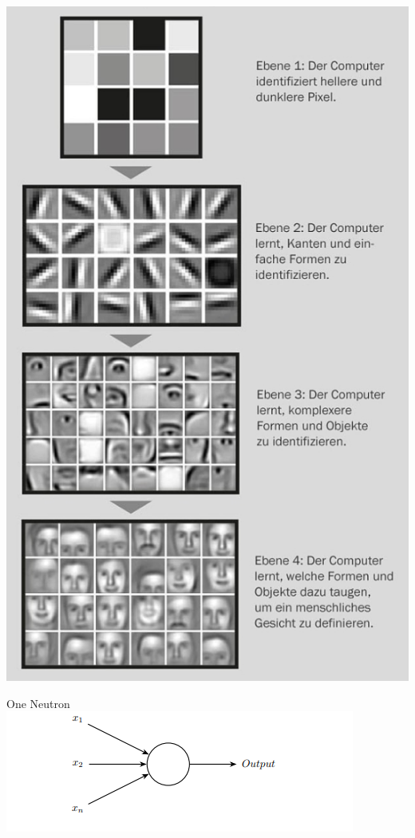 \documentclass{beamer}{}
\begin{document}
    \begin{frame}[plain]
        \center\includegraphics[height=\textheight]{img/4.png}
    \end{frame}
    \begin{frame} {One Neutron}
        \center\includegraphics[width=\textwidth]{img/2.png}
    \end{frame}
\end{document}

